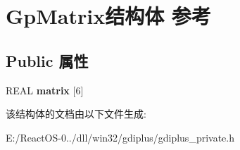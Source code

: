 \hypertarget{struct_gp_matrix}{}\section{Gp\+Matrix结构体 参考}
\label{struct_gp_matrix}
\subsection*{Public 属性}
\begin{DoxyCompactItemize}
\item 
\mbox{\label{struct_gp_matrix_a074c6b259d006f171d84b98fce533d45}} 
R\+E\+AL {\bfseries matrix} \mbox{[}6\mbox{]}
\end{DoxyCompactItemize}


该结构体的文档由以下文件生成\+:\begin{DoxyCompactItemize}
\item 
E\+:/\+React\+O\+S-\/0../dll/win32/gdiplus/gdiplus\+\_\+private.\+h\end{DoxyCompactItemize}
